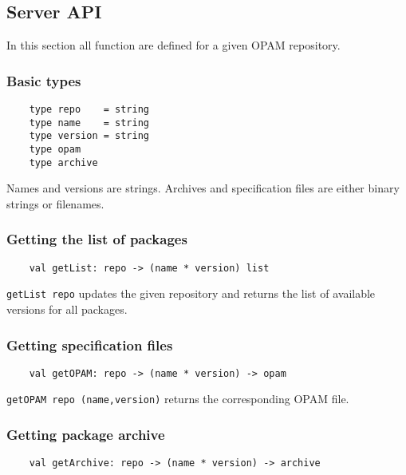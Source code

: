 \documentclass[a4paper,11pt]{article}
\begin{document}
\subsection{Server API}
\label{api}

In this section all function are defined for a given OPAM repository.

\subsubsection{Basic types}

\begin{verbatim}
    type repo    = string
    type name    = string
    type version = string
    type opam
    type archive
\end{verbatim}

Names and versions are strings. Archives and specification files are
either binary strings or filenames.

\subsubsection{Getting the list of packages}
\label{getList}

\begin{verbatim}
    val getList: repo -> (name * version) list
\end{verbatim}

{\tt getList repo} updates the given repository and returns the list of
available versions for all packages.

\subsubsection{Getting specification files}
\label{getOpam}

\begin{verbatim}
    val getOPAM: repo -> (name * version) -> opam
\end{verbatim}

{\tt getOPAM repo (name,version)} returns the corresponding OPAM file.

\subsubsection{Getting package archive}
\label{getArchive}

\begin{verbatim}
    val getArchive: repo -> (name * version) -> archive
\end{verbatim}
\end{document}
